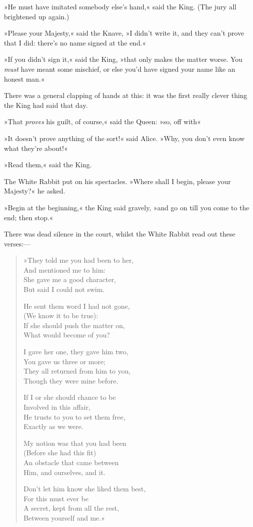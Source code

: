 »He must have imitated somebody else's hand,« said the King. (The jury all brightened up again.)

»Please your Majesty,« said the Knave, »I didn't write it, and they can't prove that I did: there's no name signed at the end.«

»If you didn't sign it,« said the King, »that only makes the matter worse. You \textit{must} have meant some mischief, or else you'd have signed your name like an honest man.«

There was a general clapping of hands at this: it was the first really clever thing the King had said that day.

»That \textit{proves} his guilt, of course,« said the Queen: »so, off with\longdash«

»It doesn't prove anything of the sort!« said Alice. »Why, you don't even know what they're about!«

»Read them,« said the King.

The White Rabbit put on his spectacles. »Where shall I begin, please your Majesty?« he asked.

»Begin at the beginning,« the King said gravely, »and go on till you come to the end; then stop.«

There was dead silence in the court, whilst the White Rabbit read out these verses:—

\begin{verse}
»They told me you had been to her,\\
\vin And mentioned me to him:\\
She gave me a good character,\\
\vin But said I could not swim.

He sent them word I had not gone,\\
\vin (We know it to be true):\\
If she should push the matter on,\\
\vin What would become of you?

I gave her one, they gave him two,\\
\vin You gave us three or more;\\
They all returned from him to you,\\
\vin Though they were mine before.

If I or she should chance to be\\
\vin Involved in this affair,\\
He trusts to you to set them free,\\
\vin Exactly as we were.

My notion was that you had been\\
\vin  (Before she had this fit)\\
An obstacle that came between\\
\vin  Him, and ourselves, and it.

Don't let him know she liked them best,\\
\vin  For this must ever be\\
A secret, kept from all the rest,\\
\vin  Between yourself and me.«
\end{verse}

